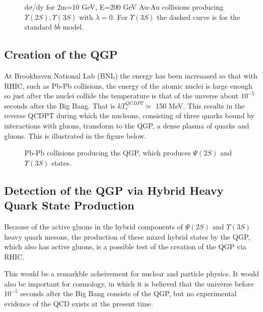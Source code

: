 \begin{figure}[ht]
\begin{center}
\caption{d$\sigma$/dy for 2m=10 GeV, E=200 GeV Au-Au collisions 
producing $\Upsilon(2S),\Upsilon(3S)$ with $\lambda=0$. For $\Upsilon(3S)$
the dashed curve is for the standard $b\bar{b}$ model.}
\label{Figure 10}
\end{center}
\end{figure}
\newpage

\subsection{Creation  of the QGP}

  At Brookhaven National Lab (BNL) the energy has been increaased so that
with RHIC, such as Pb-Pb collisions,  the energy of the atomic nuclei is
large enough so just after the nuclei collide the temperature is
that of the unverse about $10^{-5}$ seconds after the Big Bang. That is
$k T_c^{QCDPT} \simeq$ 150 MeV. This results in
the reverse QCDPT during which the nucleons, consisting of three quarks bound
by interactions with gluons, transform to the QGP, a dense plasma of quarks and
gluons. This is illustrated in the figure below.

\begin{figure}[ht]
\begin{center}
\caption{ Pb-Pb collisions producing the QGP, which produces $\Psi(2S)$ and 
$\Upsilon(3S)$ states.}
\end{center}
\end{figure}
\subsection{Detection  of the QGP via Hybrid Heavy Quark State 
Production}

  Because of the active gluons in the hybrid components of $\Psi(2S)$ and
$\Upsilon(3S)$ heavy quark mesons, the production of these mixed hybrid
states by the QGP, which also has active gluons, is a possible test of the
creation of the QGP via RHIC. 

This would be a remarkble acheivement for
nuclear and particle physics. It would also be important for cosmology,
in which it is believed that the universe before $10^{-5}$ seconds after the 
Big Bang consists of the QGP, but no experimental evidence of the QCD
exists at the present time. 

